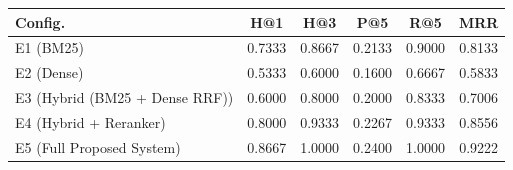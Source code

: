 \begin{tabular}{lccccc}
\hline
\textbf{Config.} & \textbf{H@1} & \textbf{H@3} & \textbf{P@5} & \textbf{R@5} & \textbf{MRR} \\
\hline
E1 (BM25) & 0.7333 & 0.8667 & 0.2133 & 0.9000 & 0.8133 \\
E2 (Dense) & 0.5333 & 0.6000 & 0.1600 & 0.6667 & 0.5833 \\
E3 (Hybrid (BM25 + Dense RRF)) & 0.6000 & 0.8000 & 0.2000 & 0.8333 & 0.7006 \\
E4 (Hybrid + Reranker) & 0.8000 & 0.9333 & 0.2267 & 0.9333 & 0.8556 \\
E5 (Full Proposed System) & 0.8667 & 1.0000 & 0.2400 & 1.0000 & 0.9222 \\
\hline
\end{tabular}
